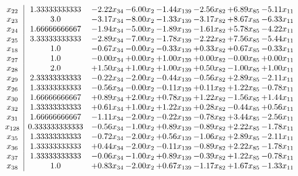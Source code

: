\documentclass[8pt]{article}
\begin{document}
\[\begin{array}{c| c c@{\hskip 2pt} c@{\hskip 2pt} c@{\hskip 2pt} c@{\hskip 2pt} c@{\hskip 2pt} c@{\hskip 2pt} }
 x_{22}   &  1.33333333333 & -2.22 x_{34} & -6.00 x_{2} & -1.44 x_{139} & -2.56 x_{82} & +  6.89 x_{85} & -5.11 x_{11}\\
 x_{23}   &  3.0 & -3.17 x_{34} & -8.00 x_{2} & -1.33 x_{139} & -3.17 x_{82} & +  8.67 x_{85} & -6.33 x_{11}\\
 x_{24}   &  1.66666666667 & -1.94 x_{34} & -5.00 x_{2} & -1.89 x_{139} & -1.61 x_{82} & +  5.78 x_{85} & -4.22 x_{11}\\
 x_{25}   &  3.33333333333 & -2.89 x_{34} & -7.00 x_{2} & -1.78 x_{139} & -2.22 x_{82} & +  7.56 x_{85} & -5.44 x_{11}\\
 x_{18}   &  1.0 & -0.67 x_{34} & -0.00 x_{2} & -0.33 x_{139} & +  0.33 x_{82} & +  0.67 x_{85} & -0.33 x_{11}\\
 x_{27}   &  1.0 & -0.00 x_{34} & +  0.00 x_{2} & +  1.00 x_{139} & +  0.00 x_{82} & -0.00 x_{85} & +  0.00 x_{11}\\
 x_{28}   &  2.0 & +  1.50 x_{34} & +  1.00 x_{2} & +  1.00 x_{139} & +  0.50 x_{82} & -1.00 x_{85} & +  1.00 x_{11}\\
 x_{29}   &  2.33333333333 & -0.22 x_{34} & -2.00 x_{2} & -0.44 x_{139} & -0.56 x_{82} & +  2.89 x_{85} & -2.11 x_{11}\\
 x_{26}   &  1.33333333333 & -0.56 x_{34} & -0.00 x_{2} & -0.11 x_{139} & +  0.11 x_{82} & +  1.22 x_{85} & -0.78 x_{11}\\
 x_{30}   &  1.66666666667 & +  0.89 x_{34} & +  2.00 x_{2} & +  0.78 x_{139} & +  1.22 x_{82} & -1.56 x_{85} & +  1.44 x_{11}\\
 x_{32}   &  1.33333333333 & +  0.61 x_{34} & +  1.00 x_{2} & +  1.22 x_{139} & +  0.28 x_{82} & -0.44 x_{85} & +  0.56 x_{11}\\
 x_{31}   &  1.66666666667 & -1.11 x_{34} & -2.00 x_{2} & -0.22 x_{139} & -0.78 x_{82} & +  3.44 x_{85} & -2.56 x_{11}\\
 x_{128}   &  0.333333333333 & -0.56 x_{34} & -1.00 x_{2} & +  0.89 x_{139} & -0.89 x_{82} & +  2.22 x_{85} & -1.78 x_{11}\\
 x_{35}   &  1.33333333333 & -0.72 x_{34} & -2.00 x_{2} & +  0.56 x_{139} & -1.06 x_{82} & +  2.89 x_{85} & -2.11 x_{11}\\
 x_{36}   &  1.33333333333 & +  0.44 x_{34} & -2.00 x_{2} & -0.11 x_{139} & -0.89 x_{82} & +  2.22 x_{85} & -1.78 x_{11}\\
 x_{37}   &  1.33333333333 & -0.06 x_{34} & -1.00 x_{2} & +  0.89 x_{139} & -0.39 x_{82} & +  1.22 x_{85} & -0.78 x_{11}\\
 x_{38}   &  1.0 & +  0.83 x_{34} & -2.00 x_{2} & +  0.67 x_{139} & -1.17 x_{82} & +  1.67 x_{85} & -1.33 x_{11}\\

\end{array}\]
\end{document}

